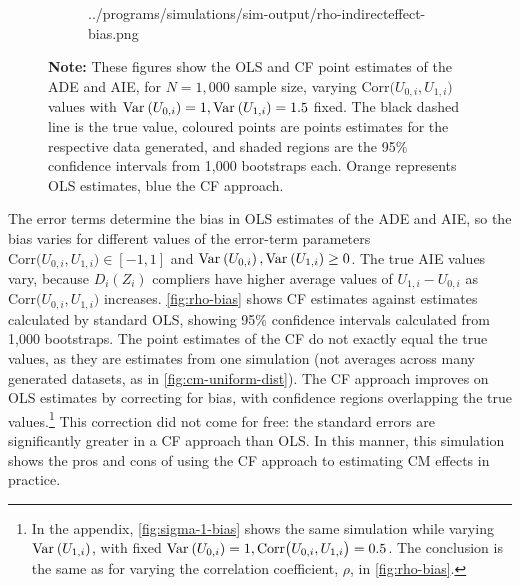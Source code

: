 \begin{figure}[h!]
\begin{subfigure}[c]{0.475\textwidth}
{            ../programs/simulations/sim-output/rho-indirecteffect-bias.png}
    \end{subfigure}
    \label{fig:rho-bias}
    \justify
    \footnotesize    
    \textbf{Note:}
    These figures show the OLS and CF point estimates of the ADE and AIE, for $N = 1,000$ sample size, varying $\text{Corr}\big(U_{0,i}, U_{1,i}\big)$ values with $\text{Var}_{} \left( U_{0,i} \right) = 1, \text{Var}_{} \left( U_{1,i} \right) = 1.5$ fixed.
    The black dashed line is the true value, coloured points are points estimates for the respective data generated, and shaded regions are the 95\% confidence intervals from 1,000 bootstraps each.
    Orange represents OLS estimates, blue the CF approach.
\end{figure}

The error terms determine the bias in OLS estimates of the ADE and AIE, so the bias varies for different values of the error-term parameters $\text{Corr}\big(U_{0,i}, U_{1,i}\big) \in [-1, 1]$ and $\text{Var}_{} \left( U_{0,i} \right), \text{Var}_{} \left( U_{1,i} \right) \geq 0$.
The true AIE values vary, because $D_i(Z_i)$ compliers have higher average values of $U_{1,i} - U_{0,i}$ as $\text{Corr}\big(U_{0,i}, U_{1,i}\big)$ increases.
\autoref{fig:rho-bias} shows CF estimates against estimates calculated by standard OLS, showing 95\% confidence intervals calculated from 1,000 bootstraps.
The point estimates of the CF do not exactly equal the true values, as they are estimates from one simulation (not averages across many generated datasets, as in \autoref{fig:cm-uniform-dist}).
The CF approach improves on OLS estimates by correcting for bias, with confidence regions overlapping the true values.\footnote{
    In the appendix, \autoref{fig:sigma-1-bias} shows the same simulation while varying $\text{Var}_{} \left( U_{1,i} \right)$, with fixed $\text{Var}_{} \left( U_{0,i} \right) = 1, \text{Corr}\big(U_{0,i}, U_{1,i}\big) = 0.5$.
    The conclusion is the same as for varying the correlation coefficient, $\rho$, in \autoref{fig:rho-bias}.
}
This correction did not come for free: the standard errors are significantly greater in a CF approach than OLS.
In this manner, this simulation shows the pros and cons of using the CF approach to estimating CM effects in practice.
